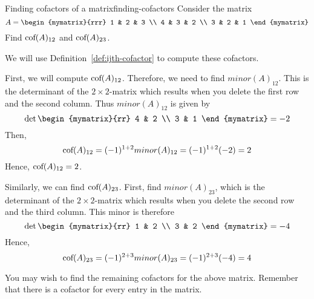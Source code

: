 \begin{example}{Finding cofactors of a matrix}{finding-cofactors}
  Consider the matrix
  \begin{equation*}
    A=\begin{mymatrix}{rrr}
      1 & 2 & 3 \\
      4 & 3 & 2 \\
      3 & 2 & 1
    \end{mymatrix} 
  \end{equation*}
  Find $\mbox{\rm cof}(A) _{12}$ and $\mbox{\rm cof}(A) _{23}$.
\end{example}

\begin{solution}
  We will use Definition~\ref{def:ijth-cofactor} to compute these
  cofactors.

  First, we will compute $\mbox{\rm cof}(A) _{12}$.  Therefore, we need to
  find $minor(A)_{12}$. This is the determinant of the
  $2\times 2$-matrix which results when you delete the first row and
  the second column. Thus $minor(A)_{12}$ is given by
  \begin{equation*}
    \det \begin{mymatrix}{rr}
      4 & 2 \\
      3 & 1
    \end{mymatrix} = -2
  \end{equation*}
  Then,
  \begin{equation*}
    \mbox{\rm cof}(A) _{12}=(-1) ^{1+2} minor(A)_{12} =(-1) ^{1+2}(-2) =2
  \end{equation*}
  Hence, $\mbox{\rm cof}(A) _{12}=2$.

  Similarly, we can find $\mbox{\rm cof}(A) _{23}$. First, find
  $minor(A)_{23}$, which is the determinant of the $2\times 2$-matrix
  which results when you delete the second row and the third
  column. This minor is therefore
  \begin{equation*}
    \det \begin{mymatrix}{rr}
      1 & 2 \\
      3 & 2
    \end{mymatrix} = -4
  \end{equation*}
  Hence,
  \begin{equation*}
    \mbox{\rm cof}(A) _{23}=(-1) ^{2+3} minor(A)_{23} =(-1) ^{2+3}(-4) =4
  \end{equation*}
\end{solution}

You may wish to find the remaining cofactors for the above
matrix. Remember that there is a cofactor for every entry in the
matrix.

